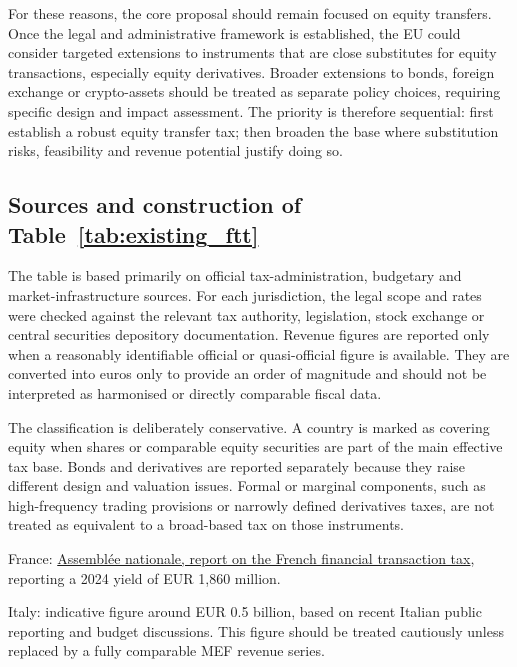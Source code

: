 \documentclass[../../main]{subfiles}
\begin{document}
For these reasons, the core proposal should remain focused on equity transfers. Once the legal and administrative framework is established, the EU could consider targeted extensions to instruments that are close substitutes for equity transactions, especially equity derivatives. Broader extensions to bonds, foreign exchange or crypto-assets should be treated as separate policy choices, requiring specific design and impact assessment. The priority is therefore sequential: first establish a robust equity transfer tax; then broaden the base where substitution risks, feasibility and revenue potential justify doing so.





\begin{footnotesize}

\subsection*{Sources and construction of Table~\ref{tab:existing_ftt}}

The table is based primarily on official tax-administration, budgetary and market-infrastructure sources. For each jurisdiction, the legal scope and rates were checked against the relevant tax authority, legislation, stock exchange or central securities depository documentation. Revenue figures are reported only when a reasonably identifiable official or quasi-official figure is available. They are converted into euros only to provide an order of magnitude and should not be interpreted as harmonised or directly comparable fiscal data.

The classification is deliberately conservative. A country is marked as covering equity when shares or comparable equity securities are part of the main effective tax base. Bonds and derivatives are reported separately because they raise different design and valuation issues. Formal or marginal components, such as high-frequency trading provisions or narrowly defined derivatives taxes, are not treated as equivalent to a broad-based tax on those instruments.

\begin{description}
\item France: \href{https://www.assemblee-nationale.fr/dyn/opendata/RINFANR5L17B1888.html}{Assemblée nationale, report on the French financial transaction tax}, reporting a 2024 yield of EUR 1,860 million. 

\item Italy: indicative figure around EUR 0.5 billion, based on recent Italian public reporting and budget discussions. This figure should be treated cautiously unless replaced by a fully comparable MEF revenue series. 


\end{description}
\end{footnotesize}
\end{document}
